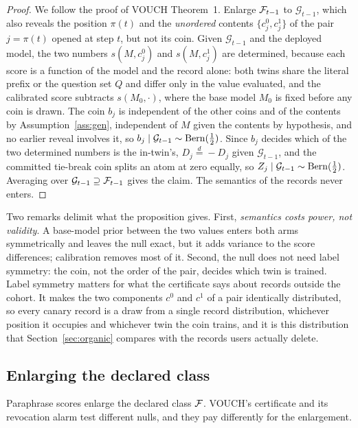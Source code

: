 \begin{proof}
We follow the proof of VOUCH Theorem~1. Enlarge $\mathcal{F}_{t-1}$ to $\mathcal G_{t-1}$,
which also reveals the position $\pi(t)$ and the \emph{unordered} contents
$\{c^0_j,c^1_j\}$ of the pair $j=\pi(t)$ opened at step $t$, but not its coin. Given
$\mathcal G_{t-1}$ and the deployed model, the two numbers $s(M,c^0_j)$ and
$s(M,c^1_j)$ are determined, because each score is a function of the model and the
record alone: both twins share the literal prefix or the question set $Q$ and differ only
in the value evaluated, and the calibrated score subtracts $s(M_0,\cdot)$, where the base
model $M_0$ is fixed before any coin is drawn. The coin $b_j$ is independent of the other
coins and of the contents by Assumption~\ref{ass:gen}, independent of $M$ given the
contents by hypothesis, and no earlier reveal involves it, so
$b_j\mid\mathcal G_{t-1}\sim\mathrm{Bern}(\frac12)$. Since $b_j$ decides which of the two
determined numbers is the in-twin's, $D_j\overset{d}{=}-D_j$ given $\mathcal G_{t-1}$,
and the committed tie-break coin splits an atom at zero equally, so
$Z_j\mid\mathcal G_{t-1}\sim\mathrm{Bern}(\frac12)$. Averaging over
$\mathcal G_{t-1}\supseteq\mathcal{F}_{t-1}$ gives the claim. The semantics of the records never
enters.
\end{proof}

Two remarks delimit what the proposition gives. First, \emph{semantics costs power, not
validity}. A base-model prior between the two values enters both arms symmetrically and
leaves the null exact, but it adds variance to the score differences; calibration
removes most of it. Second, the null does not need label symmetry: the coin, not the order of the pair,
decides which twin is trained. Label symmetry matters for what the certificate says
about records outside the cohort. It makes the two components $c^0$ and $c^1$ of a pair
identically distributed, so every canary record is a draw from a single record
distribution, whichever position it occupies and whichever twin the coin trains, and it is this distribution that Section~\ref{sec:organic} compares with
the records users actually delete.

\subsection{Enlarging the declared class}\label{sec:class}

Paraphrase scores enlarge the declared class $\mathcal{F}$. VOUCH's certificate and its revocation
alarm test different nulls, and they pay differently for the enlargement.

